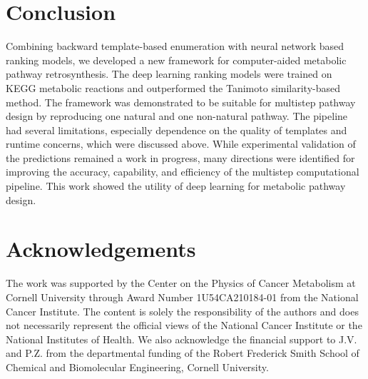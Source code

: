 \documentclass{article}
\begin{document}
%
\section{Conclusion}
Combining backward template-based enumeration with neural network based ranking models, we developed a new framework for computer-aided metabolic pathway retrosynthesis. 
The deep learning ranking models were trained on KEGG metabolic reactions and outperformed the Tanimoto similarity-based method. 
The framework was demonstrated to be suitable for multistep pathway design by reproducing one natural and one non-natural pathway. 
The pipeline had several limitations, especially dependence on the quality of templates and runtime concerns, which were discussed above.
While experimental validation of the predictions remained a work in progress, many directions were identified for improving the accuracy, capability, and efficiency of the multistep computational pipeline.
This work showed the utility of deep learning for metabolic pathway design. 



\section{Acknowledgements}
The work was supported by the Center on the Physics of Cancer Metabolism at Cornell University through Award Number 1U54CA210184-01 from the National Cancer Institute. The content is solely the responsibility of the authors and does not necessarily represent the official views of the National Cancer Institute or the National Institutes of Health.
We also acknowledge the financial support to J.V. and P.Z. from the departmental funding of the Robert Frederick Smith School of Chemical and Biomolecular Engineering, Cornell University.




\appendix

\setcounter{figure}{0}
\renewcommand{\thefigure}{S\arabic{figure}}
\renewcommand{\theHfigure}{S\arabic{figure}}
\setcounter{table}{0}
\renewcommand{\thetable}{S\arabic{table}}
\renewcommand{\theHtable}{S\arabic{table}}
\setcounter{section}{0}
\renewcommand{\thesection}{S\arabic{section}}
\renewcommand{\thesubsection}{S\arabic{section}.\arabic{subsection}}
\renewcommand{\thesubsubsection}{S\arabic{section}.\arabic{subsection}.\arabic{subsubsection}}
\end{document}
